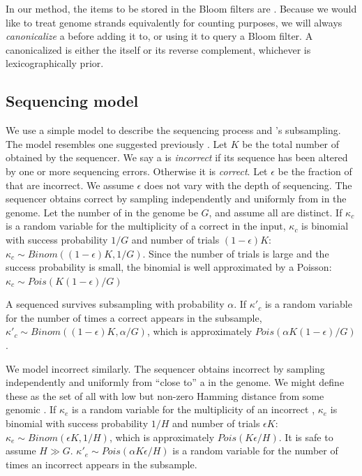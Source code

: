 \documentclass{bmcart}
\begin{document}
In our method, the items to be stored in the Bloom filters are \kmers.  Because we would like to treat genome strands equivalently for counting purposes, we will always \emph{canonicalize} a \kmer before adding it to, or using it to query a Bloom filter.  A canonicalized \kmer is either the \kmer itself or its reverse complement, whichever is lexicographically prior.

\subsection*{Sequencing model}
We use a simple model to describe the sequencing process and \tool's subsampling.  The model resembles one suggested previously \cite{melsted2014kmerstream}.  Let $K$ be the total number of \kmers obtained by the sequencer.  We say a \kmer is \emph{incorrect} if its sequence has been altered by one or more sequencing errors.  Otherwise it is \emph{correct}.  Let $\epsilon$ be the fraction of \kmers that are incorrect.  We assume $\epsilon$ does not vary with the depth of sequencing.  The sequencer obtains correct \kmers by sampling independently and uniformly from \kmers in the genome.  Let the number of \kmers in the genome be $G$, and assume all are distinct.  If $\kappa_c$ is a random variable for the multiplicity of a correct \kmer in the input, $\kappa_c$ is binomial with success probability $1/G$ and number of trials $(1-\epsilon)K$: $\kappa_c \sim Binom((1-\epsilon)K, 1/G)$.  Since the number of trials is large and the success probability is small, the binomial is well approximated by a Poisson: $\kappa_c \sim Pois(K(1-\epsilon)/G)$

A sequenced \kmer survives subsampling with probability $\alpha$.  If $\kappa'_c$ is a random variable for the number of times a correct \kmer appears in the subsample, $\kappa'_c \sim Binom((1-\epsilon)K, \alpha/G)$, which is approximately $Pois(\alpha K (1-\epsilon)/G)$.

We model incorrect \kmers similarly.  The sequencer obtains incorrect \kmers by sampling independently and uniformly from \kmers ``close to'' a \kmer in the genome.  We might define these as the set of all \kmers with low but non-zero Hamming distance from some genomic \kmer.  If $\kappa_e$ is a random variable for the multiplicity of an incorrect \kmer, $\kappa_e$ is binomial with success probability $1/H$ and number of trials $\epsilon K$: $\kappa_e \sim Binom(\epsilon K, 1/H)$, which is approximately $Pois(K \epsilon / H)$.  It is safe to assume $H \gg G$.  $\kappa'_e \sim Pois(\alpha K \epsilon / H)$ is a random variable for the number of times an incorrect \kmer appears in the subsample.
\end{document}
